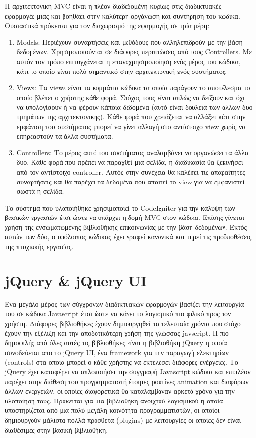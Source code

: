 Η αρχιτεκτονική MVC είναι η πλέον διαδεδομένη κυρίως στις διαδικτυακές εφαρμογές μιας και βοηθάει στην καλύτερη οργάνωση και συντήρηση του κώδικα. Ουσιαστικά πρόκειται για τον διαχωρισμό της εφαρμογής σε τρία μέρη:
\begin{enumerate}
\item Models: Περιέχουν συναρτήσεις και μεθόδους που αλληλεπιδρούν με την βάση δεδομένων. Χρησιμοποιούνται σε διάφορες περιπτώσεις από τους Controllers. Με αυτόν τον τρόπο επιτυγχάνεται η επαναχρησιμοποίηση ενός μέρος του κώδικα, κάτι το οποίο είναι πολύ σημαντικό στην αρχιτεκτονική ενός συστήματος.
\item Views: Τα views είναι τα κομμάτια κώδικα τα οποία παράγουν το αποτέλεσμα το οποίο βλέπει ο χρήστης κάθε φορά. Στόχος τους είναι απλώς να δείξουν και όχι να υπολογίσουν ή να φέρουν κάποια δεδομένα (αυτό είναι δουλειά των άλλων δυο τμημάτων της αρχιτεκτονικής). Κάθε φορά που χρειάζεται να αλλάξει κάτι στην εμφάνιση του συστήματος μπορεί να γίνει αλλαγή στο αντίστοιχο view χωρίς να επηρεαστούν τα άλλα συστήματα. 
\item Controllers: Το μέρος αυτό του συστήματος αναλαμβάνει να οργανώσει τα άλλα δυο. Κάθε φορά που πρέπει να παραχθεί μια σελίδα, η διαδικασία θα ξεκινήσει από τον αντίστοιχο controller. Αυτός στην συνέχεια θα καλέσει τις απαραίτητες συναρτήσεις και θα παρέχει τα δεδομένα που απαιτεί το view για να εμφανιστεί σωστά η σελίδα.
\end{enumerate}

Το σύστημα που υλοποιήθηκε χρησιμοποιεί το CodeIgniter για την κάλυψη των βασικών εργασιών έτσι ώστε να υπάρχει η δομή MVC στον κώδικα. Επίσης γίνεται χρήση της ενσωματωμένης βιβλιοθήκης επικοινωνίας με την βάση δεδομένων. Εκτός αυτών των δύο, ο υπόλοιπος κώδικας έχει γραφεί κανονικά και τηρεί τις προϋποθέσεις της πτυχιακής εργασίας.

\section {jQuery & jQuery UI}
Ένα μεγάλο μέρος των σύγχρονων διαδικτυακών εφαρμογών βασίζει την λειτουργία του σε κώδικα Javascript έτσι ώστε να κάνει το λογισμικό πιο φιλικό προς τον χρήστη. Διάφορες βιβλιοθήκες έχουν δημιουργηθεί τα τελευταία χρόνια που στόχο έχουν την εξέλιξη και την αποδοτικότερη χρήση της γλώσσας javscript. Η πιο δημοφιλής από όλες αυτές τις βιβλιοθήκες είναι η βιβλιοθήκη jQuery η οποία συνοδεύεται απο το jQuery UI, ένα framework για την παραγωγή ελεκτηρίων (controls) στα οποία μπορεί ο κάθε χρήστης να εκτελέσει διάφορες ενέργειες. Το jQuery έχει καταφέρει να απλοποιήσει την συγγραφή Javascript κώδικα και επιπλέον παρέχει στην διάθεση του προγραμματιστή έτοιμες ρουτίνες animation και διαφόρων άλλων ενεργειών, οι οποίες διαφορετικά θα καταλάμβαναν αρκετό χρόνο για την υλοποίηση τους. Πρόκειται για μια βιβλιοθήκη ανοιχτού λογισμικού η οποία υποστηρίζεται από μια πολύ μεγάλη κοινότητα προγραμματιστών, οι οποίοι δημιουργούν μάλιστα πολλά πρόσθετα (plugins) με λειτουργίες οι οποίες δεν είναι διαθέσιμες στην βασική βιβλιοθήκη.

